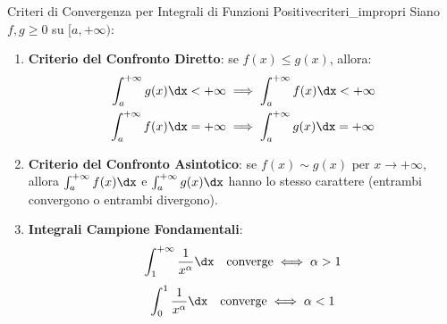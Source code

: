 \begin{teorema}{Criteri di Convergenza per Integrali di Funzioni Positive}{criteri_impropri}
Siano $f, g \ge 0$ su $[a, +\infty)$:
\begin{enumerate}
    \item \textbf{Criterio del Confronto Diretto}: se $f(x) \le g(x)$, allora:
    \begin{align*}
        \int_a^{+\infty} g(x)\dx < +\infty &\implies \int_a^{+\infty} f(x)\dx < +\infty \\
        \int_a^{+\infty} f(x)\dx = +\infty &\implies \int_a^{+\infty} g(x)\dx = +\infty
    \end{align*}
    \item \textbf{Criterio del Confronto Asintotico}: se $f(x) \sim g(x)$ per $x \to +\infty$, allora $\int_a^{+\infty} f(x)\dx$ e $\int_a^{+\infty} g(x)\dx$ hanno lo stesso carattere (entrambi convergono o entrambi divergono).
    \item \textbf{Integrali Campione Fondamentali}:
    \[
        \int_1^{+\infty} \frac{1}{x^\alpha} \dx \quad \text{converge} \iff \alpha > 1
    \]
    \[
        \int_0^1 \frac{1}{x^\alpha} \dx \quad \text{converge} \iff \alpha < 1
    \]
\end{enumerate}
\end{teorema}
